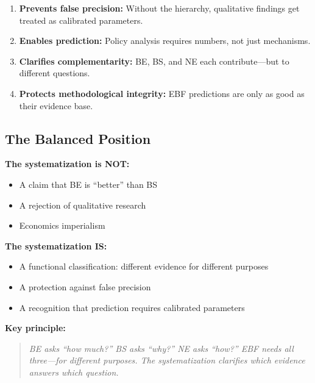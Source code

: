 \documentclass[11pt, a4paper]{article}
\begin{document}
\begin{enumerate}
\item \textbf{Prevents false precision:} Without the hierarchy, qualitative findings get treated as calibrated parameters.

\item \textbf{Enables prediction:} Policy analysis requires numbers, not just mechanisms.

\item \textbf{Clarifies complementarity:} BE, BS, and NE each contribute---but to different questions.

\item \textbf{Protects methodological integrity:} EBF predictions are only as good as their evidence base.
\end{enumerate}

\subsection{The Balanced Position}

\begin{tcolorbox}[colback=purple!5!white, colframe=purple!75!black,
    title=EBF's Position: Functional Pluralism]

\textbf{The systematization is NOT:}
\begin{itemize}[nosep]
    \item A claim that BE is ``better'' than BS
    \item A rejection of qualitative research
    \item Economics imperialism
\end{itemize}

\textbf{The systematization IS:}
\begin{itemize}[nosep]
    \item A functional classification: different evidence for different purposes
    \item A protection against false precision
    \item A recognition that prediction requires calibrated parameters
\end{itemize}

\textbf{Key principle:}
\begin{quote}
\textit{BE asks ``how much?'' BS asks ``why?'' NE asks ``how?'' EBF needs all three---for different purposes. The systematization clarifies which evidence answers which question.}
\end{quote}

\end{tcolorbox}
\end{document}
